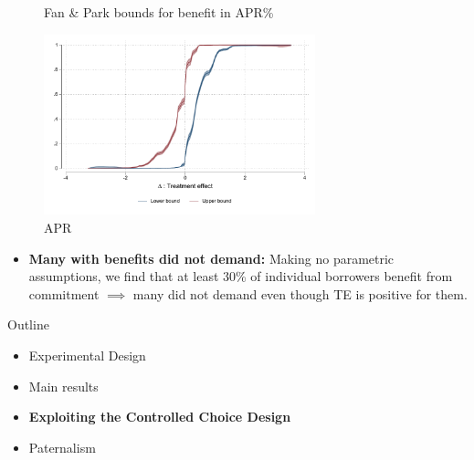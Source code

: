 \documentclass[8pt]{beamer}
\begin{document}
\begin{frame}

\begin{figure}[H]
    \caption{Fan \& Park bounds for benefit in APR\% }
    \label{fig:FanPark}
    \begin{center}
        \caption{APR}
        \centering
        \includegraphics[width=0.7\textwidth]{Figuras/fan_park_bounds_apr.pdf}
    \end{center}
    
\end{figure}

\begin{itemize}
        \vfill \item \textbf{Many with benefits did not demand:} Making no parametric assumptions, we find that at least 30\% of individual borrowers benefit from commitment $\implies$ many did not demand even though TE is positive for them.

\end{itemize}


\end{frame}


\begin{frame}{Outline}
     \begin{itemize}
         \vfill\item Experimental Design
         \vfill\item Main results
          \vfill\item \textbf{Exploiting the Controlled Choice Design}
         \vfill\item Paternalism 
     \end{itemize}
\end{frame}
\end{document}
